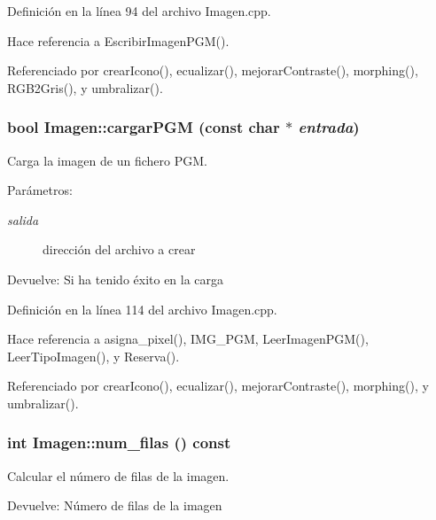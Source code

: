 Definición en la línea 94 del archivo Imagen.cpp.

Hace referencia a EscribirImagenPGM().

Referenciado por crearIcono(), ecualizar(), mejorarContraste(), morphing(), RGB2Gris(), y umbralizar().\hypertarget{classImagen_1fcb000bb29513d2fb4b77e3785827f8}{
\subsubsection[cargarPGM]{\setlength{\rightskip}{0pt plus 5cm}bool Imagen::cargarPGM (const char $\ast$ {\em entrada})}}
\label{classImagen_1fcb000bb29513d2fb4b77e3785827f8}


Carga la imagen de un fichero PGM. 

\begin{Desc}
\item[Parámetros:]
\begin{description}
\item[{\em salida}]dirección del archivo a crear \end{description}
\end{Desc}
\begin{Desc}
\item[Devuelve:]Si ha tenido éxito en la carga \end{Desc}


Definición en la línea 114 del archivo Imagen.cpp.

Hace referencia a asigna\_\-pixel(), IMG\_\-PGM, LeerImagenPGM(), LeerTipoImagen(), y Reserva().

Referenciado por crearIcono(), ecualizar(), mejorarContraste(), morphing(), y umbralizar().\hypertarget{classImagen_56e4e6b003149ea2bc9dfecf09b22d5a}{
\subsubsection[num\_\-filas]{\setlength{\rightskip}{0pt plus 5cm}int Imagen::num\_\-filas () const}}
\label{classImagen_56e4e6b003149ea2bc9dfecf09b22d5a}


Calcular el número de filas de la imagen. 

\begin{Desc}
\item[Devuelve:]Número de filas de la imagen \end{Desc}


